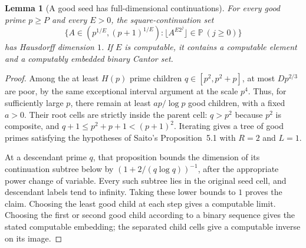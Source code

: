 \documentclass[11pt,a4paper]{article}
\newtheorem{lemma}[theorem]{Lemma}
\theoremstyle{definition}
\theoremstyle{remark}
\numberwithin{equation}{section}
\begin{document}
\begin{lemma}[A good seed has full-dimensional continuations]
\label{f13:sqnew:goodfull}
For every good prime $p\ge P$ and every $E>0$, the square-continuation set
\[
 \{A\in(p^{1/E},(p+1)^{1/E}):
      \lfloor A^{E2^j}\rfloor\in\mathbb P\ (j\ge0)\}
\]
has Hausdorff dimension $1$. If $E$ is computable, it contains a computable element and a
computably embedded binary Cantor set.
\end{lemma}
\begin{proof}
Among the at least $H(p)$ prime children
$q\in[p^2,p^2+p]$, at most $Dp^{2/3}$ are poor, by the same exceptional
interval argument at the scale $p^4$. Thus, for sufficiently large $p$,
there remain at least $a p/\log p$ good children, with a fixed $a>0$.
Their root cells are strictly inside the parent cell: $q>p^2$ because
$p^2$ is composite, and $q+1\le p^2+p+1<(p+1)^2$.
Iterating gives a tree of good primes satisfying the hypotheses of
Saito's Proposition~5.1 \cite{SaitoDimension2021} with $R=2$ and $L=1$.

At a descendant prime $q$, that proposition bounds the dimension of its
continuation subtree below by
$(1+2/(q\log q))^{-1}$, after the appropriate power change of variable.
Every such subtree lies in the original seed cell, and descendant labels
tend to infinity. Taking these lower bounds to $1$ proves the claim.
Choosing the least good child at each step gives a computable limit.
Choosing the first or second good child according to a binary sequence
gives the stated computable embedding; the separated child cells give a
computable inverse on its image.
\end{proof}
\end{document}
